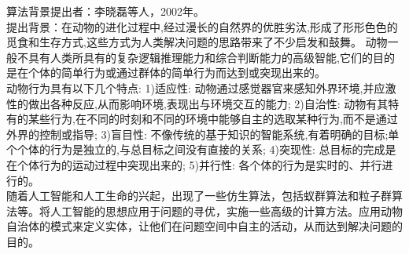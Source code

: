 \documentclass[UTF8]{ctexart}
\begin{document}
\newpage
\setcounter{page}{1}
\begin{section}
{算法背景}提出者：李晓磊等人，2002年。\\
\indent 提出背景：在动物的进化过程中,经过漫长的自然界的优胜劣汰,形成了形形色色的觅食和生存方式,这些方式为人类解决问题的思路带来了不少启发和鼓舞。 动物一般不具有人类所具有的复杂逻辑推理能力和综合判断能力的高级智能,它们的目的是在个体的简单行为或通过群体的简单行为而达到或突现出来的。\\ \indent 动物行为具有以下几个特点: 1)适应性: 动物通过感觉器官来感知外界环境,并应激性的做出各种反应,从而影响环境,表现出与环境交互的能力; 2)自治性: 动物有其特有的某些行为,在不同的时刻和不同的环境中能够自主的选取某种行为,而不是通过外界的控制或指导; 3)盲目性: 不像传统的基于知识的智能系统,有着明确的目标;单个个体的行为是独立的,与总目标之间没有直接的关系; 4)突现性: 总目标的完成是在个体行为的运动过程中突现出来的; 5)并行性: 各个体的行为是实时的、并行进行的。\\ \indent 随着人工智能和人工生命的兴起，出现了一些仿生算法，包括蚁群算法和粒子群算法等。将人工智能的思想应用于问题的寻优，实施一些高级的计算方法。应用动物自治体的模式来定义实体，让他们在问题空间中自主的活动，从而达到解决问题的目的。
\end{section}
\end{document}
